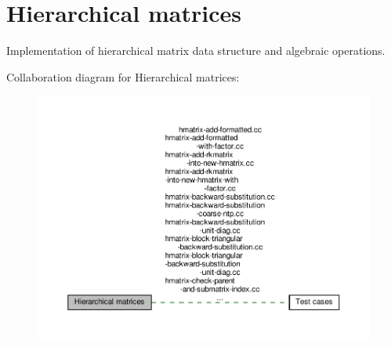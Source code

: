 \hypertarget{group__hierarchical__matrices}{}\section{Hierarchical matrices}
\label{group__hierarchical__matrices}


Implementation of hierarchical matrix data structure and algebraic operations.  


Collaboration diagram for Hierarchical matrices\+:\nopagebreak
\begin{figure}[H]
\begin{center}
\leavevmode
\includegraphics[width=350pt]{group__hierarchical__matrices}
\end{center}
\end{figure}
